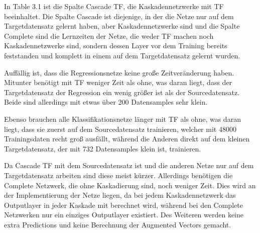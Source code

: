 In Table 3.1 ist die Spalte Cascade TF, die Kaskadennetzwerke mit TF beeinhaltet. Die Spalte Cascade ist diejenige, in der die Netze nur auf dem 
Targetdatensatz gelernt haben, aber Kaskadennetzwerke sind und die Spalte Complete sind die Lernzeiten der Netze, die weder TF machen noch 
Kaskadennetzwerke sind, sondern dessen Layer vor dem Training bereits feststanden und komplett in einem auf dem Targetdatensatz gelernt wurden. 

Auffällig ist, dass die Regressionsnetze keine große Zeitveränderung haben. Mitunter benötigt mit TF weniger Zeit als ohne, was daran liegt, dass 
der Targetdatensatz der Regression ein wenig größer ist als der Sourcedatensatz. Beide sind allerdings mit etwas über 200 Datensamples sehr klein. 

Ebenso brauchen alle Klassifikationsnetze länger mit TF als ohne, was daran liegt, dass sie zuerst auf dem Sourcedatensatz trainieren, welcher mit 
48000 Trainingsdaten recht groß ausfällt, während die Anderen direkt auf dem kleinen Targetdatensatz, der mit 732 Datensamples klein ist, 
trainieren. 

Da Cascade TF mit dem Sourcedatensatz ist und die anderen Netze nur auf dem Targetdatensatz arbeiten sind diese meist kürzer. Allerdings 
benötigen die Complete Netzwerk, die ohne Kaskadierung sind, noch weniger Zeit. Dies wird an der Implementierung der Netze liegen, da bei jedem 
Kaskadennetzwerk das Outputlayer in jeder Kaskade mit berechnet wird, während bei den Complete Netzwerken nur ein einziges Outputlayer existiert. 
Des Weiteren werden keine extra Predictions und keine Berechnung der Augmented Vectors gemacht. 
